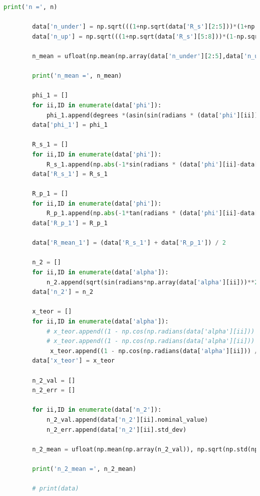 \documentclass[a4paper,11pt]{article}
\begin{document}
\begin{lstlisting}[language=Python, basicstyle=\tiny, breaklines=true, postbreak=\mbox{\textbackslashspace}]
        print('n =', n)
        
        data['n_under'] = np.sqrt(((1+np.sqrt(data['R_s'][2:5]))*(1+np.sqrt(data['R_p'][2:5])))/((1-np.sqrt(data['R_s'][2:5]))*(1-np.sqrt(data['R_p'][2:5]))))
        data['n_up'] = np.sqrt(((1+np.sqrt(data['R_s'][5:8]))*(1-np.sqrt(data['R_p'][5:8])))/((1-np.sqrt(data['R_s'][5:8]))*(1+np.sqrt(data['R_p'][5:8]))))
        
        n_mean = ufloat(np.mean(np.array(data['n_under'][2:5],data['n_up'][5:8])), np.std(np.array(data['n_under'][2:5],data['n_up'][5:8])))
        
        print('n_mean =', n_mean)
        
        phi_1 = []
        for ii,ID in enumerate(data['phi']):
            phi_1.append(degrees *(asin(sin(radians * (data['phi'][ii]))/n_mean)))
        data['phi_1'] = phi_1
        
        R_s_1 = []
        for ii,ID in enumerate(data['phi']):
            R_s_1.append(np.abs(-1*sin(radians * (data['phi'][ii]-data['phi_1'][ii])) / sin(radians * (data['phi'][ii]+data['phi_1'][ii])))**2)
        data['R_s_1'] = R_s_1
        
        R_p_1 = []
        for ii,ID in enumerate(data['phi']):
            R_p_1.append(np.abs(-1*tan(radians * (data['phi'][ii]-data['phi_1'][ii])) / tan(radians * (data['phi'][ii]+data['phi_1'][ii])))**2)
        data['R_p_1'] = R_p_1
        
        data['R_mean_1'] = (data['R_s_1'] + data['R_p_1']) / 2
        
        n_2 = []
        for ii,ID in enumerate(data['alpha']):
            n_2.append(sqrt(sin(radians*np.array(data['alpha'][ii]))**2 + (1 - (data['x_1'][ii] / (d*sin(radians*data['alpha'][ii]))))**(-2)*np.cos(radians*data['alpha'][ii])**2))
        data['n_2'] = n_2
        
        x_teor = []
        for ii,ID in enumerate(data['alpha']):
            # x_teor.append((1 - np.cos(np.radians(data['alpha'][ii])) / sqrt(n**2 - np.sin(np.radians(data['alpha'][ii]))**2)) * d * np.sin(np.radians(data['alpha'][ii])))
            # x_teor.append((1 - np.cos(np.radians(data['alpha'][ii])) / sqrt(n_mean**2 - np.sin(np.radians(data['alpha'][ii]))**2)) * d * np.sin(np.radians(data['alpha'][ii])))
             x_teor.append((1 - np.cos(np.radians(data['alpha'][ii])) / sqrt(n_2_mean**2 - np.sin(np.radians(data['alpha'][ii]))**2)) * d * np.sin(np.radians(data['alpha'][ii])))
        data['x_teor'] = x_teor
        
        n_2_val = []
        n_2_err = []
        
        for ii,ID in enumerate(data['n_2']):
            n_2_val.append(data['n_2'][ii].nominal_value)
            n_2_err.append(data['n_2'][ii].std_dev)
        
        n_2_mean = ufloat(np.mean(np.array(n_2_val)), np.sqrt(np.std(np.array(n_2_err))**2+np.mean(np.array(n_2_err))**2))
        
        print('n_2_mean =', n_2_mean)
        
        # print(data)
    \end{lstlisting}        
\end{document}
